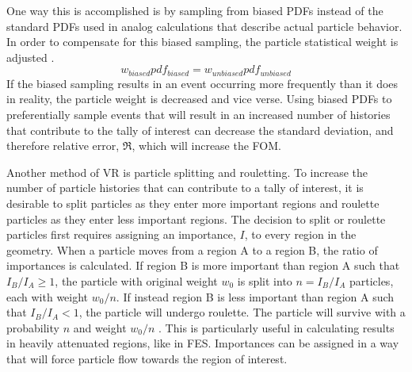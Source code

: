 One way this is accomplished is by sampling from biased PDFs instead of the
standard PDFs used in analog calculations that describe actual particle behavior.
In order to compensate for this biased sampling, the particle statistical weight
is adjusted \cite{cadis}.
\begin{equation} \label{eq:2.1}
		w_{biased} pdf_{biased} = w_{unbiased} pdf_{unbiased}
\end{equation}
If the biased sampling results in an event occurring more frequently than it
does in reality,
the particle weight is decreased and vice verse.  Using biased PDFs 
to preferentially sample events that will result in an increased number of histories that
contribute to the tally of interest 
can decrease the standard deviation, and
therefore relative error, $\Re$, which will increase the FOM.

Another method of VR is particle splitting
and rouletting.  
To increase the number of particle histories that can contribute to a tally of
interest, it is desirable to split particles as they enter more important 
regions and roulette particles as they enter less important regions. 
The decision to split or roulette particles first requires assigning an 
importance, $I$, to every region in the geometry. 
When a particle moves from a region A to a region B,
the ratio of importances is calculated.  If region B is more important than
region A such that 
$I_{B}/I_{A} \geqslant 1$, 
the particle with original weight $w_{0}$ is split into 
$n = I_{B}/I_{A}$
particles, each with weight $w_{0}/n$.  If instead region B is less important
than region A such that
$I_{B}/I_{A} < 1$, 
the particle will undergo roulette. 
The particle will survive with a probability $n$ and weight $w_{0}/n$
\cite{Carter_Cashwell_1975}.
This is particularly useful in calculating results in heavily attenuated
regions, like in FES.  Importances can be assigned in a way that will force
particle flow towards the region of interest.

